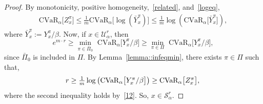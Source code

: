 \documentclass[letterpaper, 10 pt, conference]{ieeeconf}  %
\begin{document}
\begin{proof}
By monotonicity, positive homogeneity,~\eqref{related}, and~\eqref{logeq},
%
\begin{equation}\begin{aligned}
\text{CVaR}_\alpha\big[ Z_x^\pi \big] \leq \textstyle\frac{1}{m} \text{CVaR}_\alpha\big[ \log\left( \bar{Y}_x^\pi \right) \big] 
\leq \textstyle\frac{1}{m} \log \left(\text{CVaR}_\alpha\big[ \bar{Y}_x^\pi \big] \right),
\end{aligned}\label{12}\end{equation}
%
where $\bar{Y}_x^\pi := Y_x^\pi/\beta$. Now, if $x \in \mathcal{U}_\alpha^r$, then
%
\begin{equation*}
e^{m\cdot r} \geq {\underset{\pi \in \bar{\Pi}_0}\min}\text{ CVaR}_\alpha \big[ Y_x^\pi /\beta \big] \geq {\underset{\pi \in \Pi}\min}\text{ CVaR}_\alpha \big[ Y_x^\pi /\beta \big], 
\end{equation*}
%
since $\bar{\Pi}_0$ is included in $\Pi$. By Lemma~\ref{lemma::infeqmin}, there exists $\pi \in \Pi$ such that,
\begin{equation*}
r \geq \textstyle\frac{1}{m}\log \left( \text{CVaR}_\alpha \big[  Y_x^\pi /\beta \big] \right) \geq \text{CVaR}_\alpha\big[ Z_x^\pi \big], \\
\end{equation*}
where the second inequality holds by~\eqref{12}. So, $x \in \mathcal{S}_\alpha^r$.
\end{proof}
\end{document}
